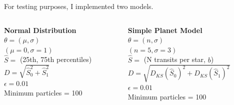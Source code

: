 \documentclass{beamer}
\begin{document}
\begin{frame}{For testing purposes, I implemented two models.}
\begin{center}
\begin{columns}[l] 
\begin{column}[T]{5cm}
\textbf{Normal Distribution}  \\
\vspace{0.5cm}
$\theta = (\mu,\sigma)$ \\
\vspace{0.5cm}
$(\mu=0, \sigma=1)$ \\
\vspace{0.5cm}
$\widehat{S} =$ (25th, 75th percentiles) \\
\vspace{0.5cm}
$D = \sqrt{\widehat{S}_{0}^2 + \widehat{S}_{1}^2 }$ \\
\vspace{0.5cm}
$\epsilon = 0.01$ \\
\vspace{0.5cm}
Minimum particles = 100
\vspace{0.5cm}


\end{column}
\begin{column}[T]{5cm}
 \textbf{Simple Planet Model} \\
 \vspace{0.5cm}
 $\theta = (n,\sigma)$ \\
 \vspace{0.5cm}
$(n=5, \sigma=3)$ \\
\vspace{0.5cm}
$\widehat{S} =$ (N transits per star, $b$) \\
\vspace{0.5cm}
$D = \sqrt{D_{KS}(\widehat{S}_{0})^2 + D_{KS}(\widehat{S}_{1})^2 }$ \\
\vspace{0.5cm}
$\epsilon = 0.01$ \\
\vspace{0.5cm}
Minimum particles = 100
\vspace{0.5cm}
\end{column}
\end{columns}
\end{center}
\end{frame}

\begin{frame}{}

\end{frame}
\end{document}
